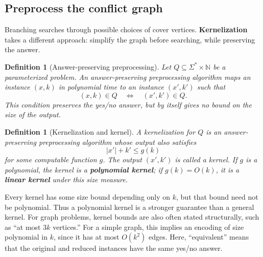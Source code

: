 \documentclass[11pt]{article}
\newtheorem{definition}[theorem]{Definition}
\begin{document}
\subsection{Preprocess the conflict graph}

Branching searches through possible choices of cover vertices. \textbf{Kernelization} takes a different approach: simplify the graph before searching, while preserving the answer.

\begin{definition}[Answer-preserving preprocessing]
Let $Q\subseteq\Sigma^*\times\mathbb{N}$ be a parameterized problem. An answer-preserving preprocessing algorithm maps an instance $(x,k)$ in polynomial time to an instance $(x',k')$ such that
\[
(x,k)\in Q\quad\Longleftrightarrow\quad(x',k')\in Q.
\]
This condition preserves the yes/no answer, but by itself gives no bound on the size of the output.
\end{definition}

\begin{definition}[Kernelization and kernel]
A kernelization for $Q$ is an answer-preserving preprocessing algorithm whose output also satisfies
\[
|x'|+k'\leq g(k)
\]
for some computable function $g$. The output $(x',k')$ is called a kernel. If $g$ is a polynomial, the kernel is a \textbf{polynomial kernel}; if $g(k)=O(k)$, it is a \textbf{linear kernel} under this size measure.
\end{definition}

Every kernel has some size bound depending only on $k$, but that bound need not be polynomial. Thus a polynomial kernel is a stronger guarantee than a general kernel. For graph problems, kernel bounds are also often stated structurally, such as “at most $3k$ vertices.” For a simple graph, this implies an encoding of size polynomial in $k$, since it has at most $O(k^2)$ edges. Here, “equivalent” means that the original and reduced instances have the same yes/no answer.
\end{document}
